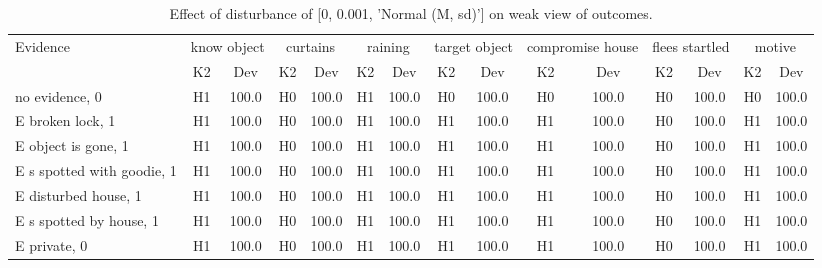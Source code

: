 \begin{table}\begin{tabular}{l|cc|cc|cc|cc|cc|cc|cc}\toprule\multirow{2}{*}{Evidence} & \multicolumn{2}{c}{know object}& \multicolumn{2}{c}{curtains}& \multicolumn{2}{c}{raining}& \multicolumn{2}{c}{target object}& \multicolumn{2}{c}{compromise house}& \multicolumn{2}{c}{flees startled}& \multicolumn{2}{c}{motive}\\& {K2} & {Dev}& {K2} & {Dev}& {K2} & {Dev}& {K2} & {Dev}& {K2} & {Dev}& {K2} & {Dev}& {K2} & {Dev}\\\midrule
no evidence, 0 & H1&100.0&H0&100.0&H1&100.0&H0&100.0&H0&100.0&H0&100.0&H0&100.0\\E broken lock, 1 & H1&100.0&H0&100.0&H1&100.0&H1&100.0&H1&100.0&H0&100.0&H1&100.0\\E object is gone, 1 & H1&100.0&H0&100.0&H1&100.0&H1&100.0&H1&100.0&H0&100.0&H1&100.0\\E s spotted with goodie, 1 & H1&100.0&H0&100.0&H1&100.0&H1&100.0&H1&100.0&H0&100.0&H1&100.0\\E disturbed house, 1 & H1&100.0&H0&100.0&H1&100.0&H1&100.0&H1&100.0&H0&100.0&H1&100.0\\E s spotted by house, 1 & H1&100.0&H0&100.0&H1&100.0&H1&100.0&H1&100.0&H0&100.0&H1&100.0\\E private, 0 & H1&100.0&H0&100.0&H1&100.0&H1&100.0&H1&100.0&H0&100.0&H1&100.0\\\bottomrule\end{tabular}\caption{Effect of disturbance of [0, 0.001, 'Normal (M, sd)'] on weak view of outcomes.}\end{table}